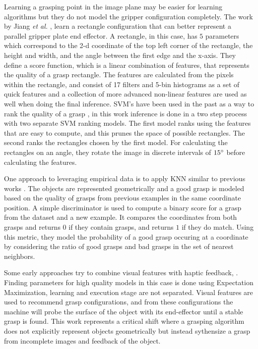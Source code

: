 \documentclass{article}
\begin{document}
Learning a grasping point in the image plane may be easier for learning algorithms
but they do not model the gripper configuration completely. The work by Jiang
\textit{et al.}
\cite{jiang11}, learn a rectangle configuration that can better represent a parallel
gripper plate end effector. A rectangle, in this case, has $5$ parameters which
correspond to the 2-d coordinate of the top left corner of the rectangle, the height
and width, and the angle between the first edge and the x-axis. They define a score
function, which is a linear combination of features, that represents the quality of
a grasp rectangle. The features are calculated from the pixels within the rectangle, and
consist of 17 filters and 5-bin histograms as a set of quick features and a collection of
more advanced non-linear features are used as well when doing the final inference.
SVM's have been used in the past as a way to rank the quality of a grasp \cite{le10},
in this work inference is done in a two step process
with two separate SVM ranking models. The first model ranks using the features that
are easy to compute, and this prunes the space of possible rectangles. The second ranks
the rectangles chosen by the first model. For calculating the rectangles on an angle,
they rotate the image in discrete intervals of $15\degree$ before calculating
the features.

One approach to leveraging empirical data is to apply KNN
similar to previous works \cite{zhang11,ciocarlie14}.
The objects are represented geometrically and a good grasp is modeled based
on the quality of grasps from previous examples in the same coordinate position.
A simple discriminator is used to compute a binary score for a grasp from the
dataset and a new example. It compares the coordinates from both grasps and
returns $0$ if they contain grasps, and returns $1$ if they do
match. Using this metric, they model the probability of a good grasp occuring
at a coordinate by considering the ratio of good grasps and bad grasps in the
set of nearest neighbors.

Some early approaches try to combine visual features with haptic feedback,
\cite{piater02,coelho01}. Finding parameters for high quality models in this
case is done using Expectation Maximization, learning and execution stage
are not separated. Visual
features are used to recommend grasp configurations, and from these configurations
the machine will probe the surface of the object with its end-effector until
a stable grasp is found. This work represents a critical shift where a grasping
algorithm does not explicitly represent objects geometrically but instead
sythensize a grasp from incomplete images and feedback of the object.
\end{document}
